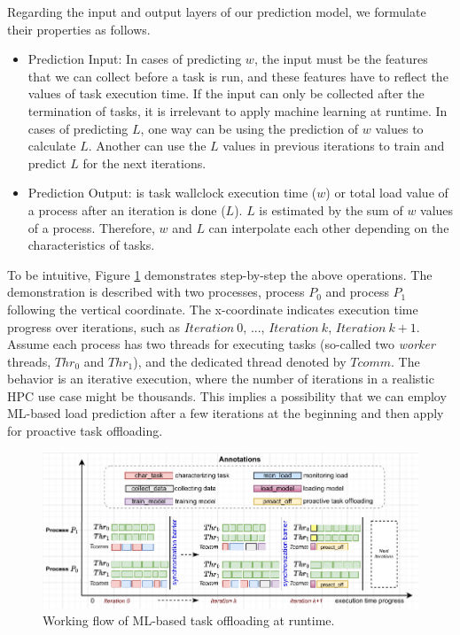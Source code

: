 Regarding the input and output layers of our prediction model, we formulate their properties as follows.

\begin{itemize}
	\item Prediction Input: In cases of predicting $w$, the input must be the features that we can collect before a task is run, and these features have to reflect the values of task execution time. If the input can only be collected after the termination of tasks, it is irrelevant to apply machine learning at runtime. In cases of predicting $L$, one way can be using the prediction of $w$ values to calculate $L$. Another can use the $L$ values in previous iterations to train and predict $L$ for the next iterations.
	
	\item Prediction Output: is task wallclock execution time ($w$) or total load value of a process after an iteration is done ($L$). $L$ is estimated by the sum of $w$ values of a process. Therefore, $w$ and $L$ can interpolate each other depending on the characteristics of tasks.
\end{itemize}

To be intuitive, Figure \ref{fig:ml_based_workingflow} demonstrates step-by-step the above operations. The demonstration is described with two processes, process $P_{0}$ and process $P_{1}$ following the vertical coordinate. The x-coordinate indicates execution time progress over iterations, such as $Iteration\ 0$, ..., $Iteration\ k$, $Iteration\ k+1$. Assume each process has two threads for executing tasks (so-called two \textit{worker} threads, $Thr_{0}$ and $Thr_{1}$), and the dedicated thread denoted by $Tcomm$. The behavior is an iterative execution, where the number of iterations in a realistic HPC use case might be thousands. This implies a possibility that we can employ ML-based load prediction after a few iterations at the beginning and then apply for proactive task offloading.\\

\begin{figure}[t]
  \centering
  \includegraphics[scale=0.825]{./pictures/padlb_approach/padlb_mlbased_lb_workingflow.pdf}
	\caption{Working flow of ML-based task offloading at runtime.}
	\label{fig:ml_based_workingflow}
\end{figure}


